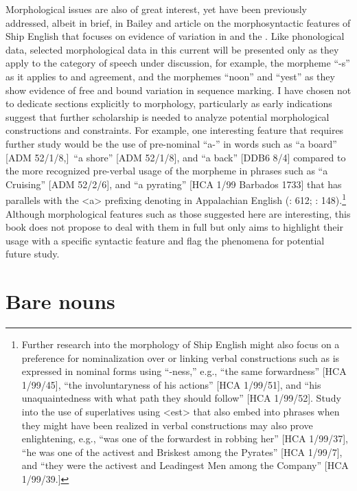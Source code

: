 Morphological issues are also of great interest, yet have been previously addressed, albeit in brief, in Bailey and  article on the morphosyntactic features of Ship English that focuses on evidence of variation in  and the . Like phonological data, selected morphological data in this current  will be presented only as they apply to the category of speech under discussion, for example, the morpheme “-s” as it applies to  and   agreement, and the morphemes “noon” and “yest” as they show evidence of free and bound variation in sequence marking. I have chosen not to dedicate sections explicitly to morphology, particularly as early indications suggest that further scholarship is needed to analyze potential morphological constructions and constraints. For example, one interesting feature that requires further study would be the use of pre-nominal “a-” in words such as “a board” [ADM 52/1/8,]~“a shore” [ADM 52/1/8], and “a back” [DDB6 8/4] compared to the more recognized pre-verbal usage of the morpheme in phrases such as “a Cruising” [ADM 52/2/6], and “a pyrating” [HCA 1/99 Barbados {1733}] that has parallels with the <a> prefixing denoting  in Appalachian English (\citealt{Hickey2004}: 612; \citealt{Montgomery2001}: 148).\footnote{Further research into the morphology of Ship English might also focus on a preference for nominalization over  or linking verbal constructions such as is expressed in nominal forms using “-ness,” e.g., “the same forwardness” [HCA 1/99/45], “the involuntaryness of his actions” [HCA 1/99/51], and “his unaquaintedness with what path they should follow” [HCA 1/99/52]. Study into the use of  superlatives using <est> that also embed into  phrases when they might have been realized in verbal constructions may also prove enlightening, e.g., “was one of the forwardest in robbing her” [HCA 1/99/37], “he was one of the activest and Briskest among the Pyrates” [HCA 1/99/7], and “they were the activest and Leadingest Men among the Company” [HCA 1/99/39.]} Although morphological features such as those suggested here are interesting, this book does not propose to deal with them in full but only aims to highlight their usage with a specific syntactic feature and flag the phenomena for potential future study. 

\section{{Bare nouns}}\label{sec:5.2}

